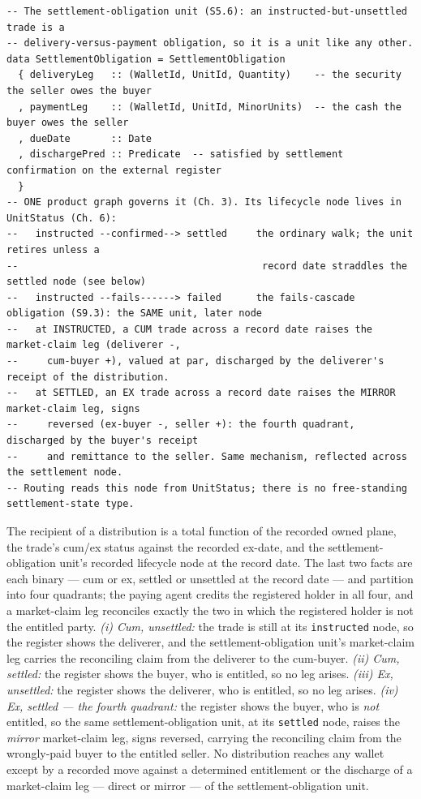 \begin{lstlisting}
-- The settlement-obligation unit (S5.6): an instructed-but-unsettled trade is a
-- delivery-versus-payment obligation, so it is a unit like any other.
data SettlementObligation = SettlementObligation
  { deliveryLeg   :: (WalletId, UnitId, Quantity)    -- the security the seller owes the buyer
  , paymentLeg    :: (WalletId, UnitId, MinorUnits)  -- the cash the buyer owes the seller
  , dueDate       :: Date
  , dischargePred :: Predicate  -- satisfied by settlement confirmation on the external register
  }
-- ONE product graph governs it (Ch. 3). Its lifecycle node lives in UnitStatus (Ch. 6):
--   instructed --confirmed--> settled     the ordinary walk; the unit retires unless a
--                                          record date straddles the settled node (see below)
--   instructed --fails------> failed      the fails-cascade obligation (S9.3): the SAME unit, later node
--   at INSTRUCTED, a CUM trade across a record date raises the market-claim leg (deliverer -,
--     cum-buyer +), valued at par, discharged by the deliverer's receipt of the distribution.
--   at SETTLED, an EX trade across a record date raises the MIRROR market-claim leg, signs
--     reversed (ex-buyer -, seller +): the fourth quadrant, discharged by the buyer's receipt
--     and remittance to the seller. Same mechanism, reflected across the settlement node.
-- Routing reads this node from UnitStatus; there is no free-standing settlement-state type.
\end{lstlisting}

\begin{proposition}
The recipient of a distribution is a total function of the recorded owned plane, the
trade's cum/ex status against the recorded ex-date, and the settlement-obligation unit's
recorded lifecycle node at the record date. The last two facts are each binary --- cum or
ex, settled or unsettled at the record date --- and partition into four quadrants; the
paying agent credits the registered holder in all four, and a market-claim leg reconciles
exactly the two in which the registered holder is not the entitled party.
\emph{(i) Cum, unsettled:} the trade is still at its \texttt{instructed} node, so the
register shows the deliverer, and the settlement-obligation unit's market-claim leg
carries the reconciling claim from the deliverer to the cum-buyer.
\emph{(ii) Cum, settled:} the register shows the buyer, who is entitled, so no leg arises.
\emph{(iii) Ex, unsettled:} the register shows the deliverer, who is entitled, so no leg
arises.
\emph{(iv) Ex, settled --- the fourth quadrant:} the register shows the buyer, who is
\emph{not} entitled, so the same settlement-obligation unit, at its \texttt{settled} node,
raises the \emph{mirror} market-claim leg, signs reversed, carrying the reconciling claim
from the wrongly-paid buyer to the entitled seller.
No distribution reaches any wallet except by a recorded move against a determined
entitlement or the discharge of a market-claim leg --- direct or mirror --- of the
settlement-obligation unit.
\end{proposition}

